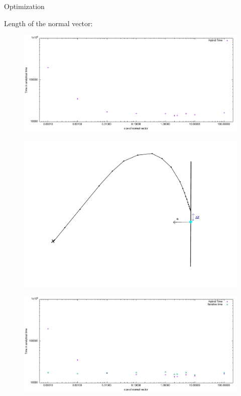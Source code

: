 \documentclass{beamer}
\begin{document}
\begin{frame}
	\centering
	Optimization
\end{frame}
\begin{frame}
	Length of the normal vector:
	\begin{figure}
		\includegraphics[width=\textwidth]{figures/NormVsRealTime.pdf}
	\end{figure}
\end{frame}
\begin{frame}
	\begin{figure}
		\includegraphics[width=\textwidth]{figures/PrincipleNormIllu.pdf}
	\end{figure}
\end{frame}
\begin{frame}
	\begin{figure}
		\includegraphics[width=\textwidth]{figures/NormVsRealTime2.pdf}
	\end{figure}
\end{frame}
\end{document}

